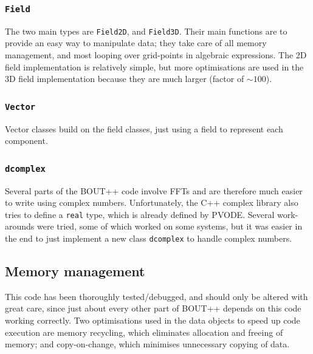 \documentclass[12pt]{article}
\newcommand{\code}[1]{\texttt{#1}}
\begin{document}
\subsubsection{\code{Field}}

The two main types are \code{Field2D}, and \code{Field3D}. Their main functions
are to provide an easy way to manipulate data; they take care of all memory management,
and most looping over grid-points in algebraic expressions. The 2D field implementation
is relatively simple, but more optimisations are used in the 3D field implementation
because they are much larger (factor of $\sim 100$).

\subsubsection{\code{Vector}}

Vector classes build on the field classes, just using a field to represent
each component. 

\subsubsection{\code{dcomplex}}

Several parts of the BOUT++ code involve FFTs and are therefore much easier to
write using complex numbers. Unfortunately, the C++ complex library also tries
to define a \code{real} type, which is already defined by PVODE. Several
work-arounds were tried, some of which worked on some systems, but
it was easier in the end to just implement a new class \code{dcomplex} to
handle complex numbers.

\subsection{Memory management}

This code has been thoroughly tested/debugged, and should only be altered
with great care, since just about every other part of BOUT++ depends on this code
working correctly. Two optimisations used in the data objects to speed up code execution
are memory recycling, which eliminates allocation and freeing of memory; and copy-on-change,
which minimises unnecessary copying of data.
\end{document}
